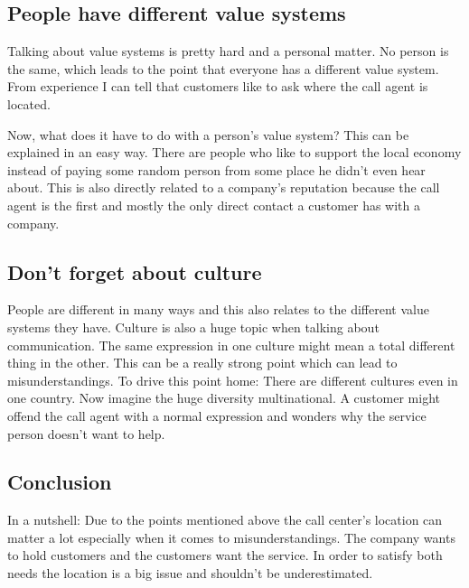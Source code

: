 \documentclass[a4paper,11pt]{scrartcl}%
\begin{document}
	\subsection{People have different value systems}
	Talking about value systems is pretty hard and a personal matter. No person is the same, which leads to the point
	that everyone has a different value system. From experience I can tell that customers like to ask where the call
	agent is located.\par
	Now, what does it have to do with a person's value system? This can be explained in an easy way. There are people who
	like to support the local economy instead of paying some random person from some place he didn't even hear about.
	This is also directly related to a company's reputation because the call agent is the first and mostly the only
	direct contact a customer has with a company.

	\subsection{Don't forget about culture}
	People are different in many ways and this also relates to the different value systems they have. Culture is also
	a huge topic when talking about communication. The same expression in one culture might mean a total different thing
	in the other. This can be a really strong point which can lead to misunderstandings. To drive this point home:
	There are different cultures even in one country. Now imagine the huge diversity multinational. A customer might
	offend the call agent with a normal expression and wonders why the service person doesn't want to help.
	
	\subsection{Conclusion}
	In a nutshell: Due to the points mentioned above the call center's location can matter a lot especially when it comes
	to misunderstandings. The company wants to hold customers and the customers want the service. In order to satisfy
	both needs the location is a big issue and shouldn't be underestimated.
	
\end{document}
